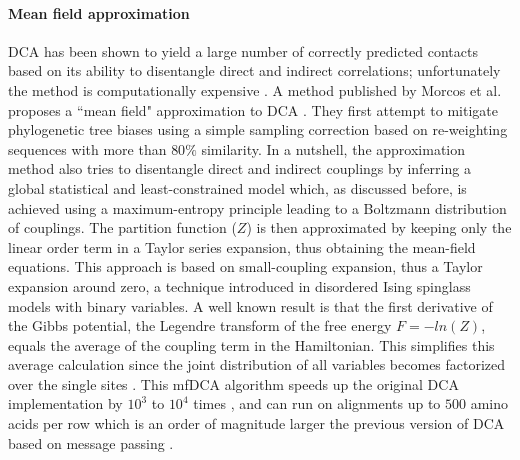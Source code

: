 \paragraph{Mean field approximation}
DCA has been shown to yield a large number of correctly predicted contacts based on its ability to disentangle direct and indirect correlations; unfortunately the method is computationally expensive \cite{weigt2009identification}.
A method published by Morcos et al. \cite{morcos2011direct} proposes a ``mean field" approximation to DCA \cite{weigt2009identification}.
They first attempt to mitigate phylogenetic tree biases using a simple sampling correction based on re-weighting  sequences with more than $80\%$ similarity.
In a nutshell, the approximation method also tries to disentangle direct and indirect couplings by inferring a global statistical and least-constrained model which, as discussed before, is achieved using a maximum-entropy principle leading to a Boltzmann distribution of couplings.
The partition function ($Z$) is then approximated by keeping only the linear order term in a Taylor series expansion, thus obtaining the mean-field equations.
This approach is based on small-coupling expansion, thus a Taylor expansion around zero, a technique introduced in disordered Ising spinglass models with binary variables.
A well known result is that the first derivative of the Gibbs potential, the Legendre transform of the free energy $F = - ln(Z)$, equals the average of the coupling term in the Hamiltonian.
This simplifies this average calculation since the joint distribution of all variables becomes factorized over the single sites \cite{morcos2011direct}.
This mfDCA algorithm speeds up the original DCA implementation by $10^3$ to $10^4$ times \cite{morcos2011direct}, and can run on alignments up to $500$ amino acids per row which is an order of magnitude larger the previous version of DCA based on message passing \cite{morcos2011direct, weigt2009identification}.

